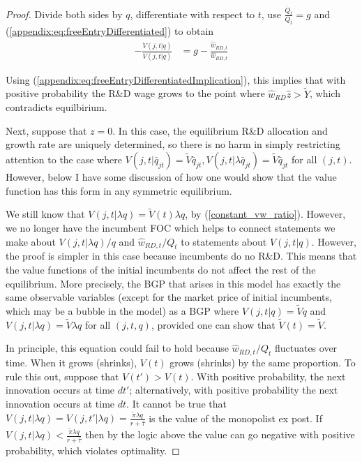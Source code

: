 \documentclass[11pt,english]{article}
\begin{document}
\begin{proof}
	Divide both sides by $q$, differentiate with respect to $t$, use $\frac{\dot{Q}_t}{Q_t} = g$ and  (\ref{appendix:eq:freeEntryDifferentiated}) to obtain
	\begin{align}
	-\frac{\dot{V}(j,t|q)}{V(j,t|q)} &= g - \frac{\dot{\hat{w}}_{RD,t}}{\hat{w}_{RD,t}}  \label{appendix:eq:freeEntryDifferentiatedImplication}
	\end{align}
	
	Using (\ref{appendix:eq:freeEntryDifferentiatedImplication}), this implies that with positive probability the R\&D wage grows to the point where $\hat{w}_{RD} \hat{z} > \tilde{Y}$, which contradicts equilbirium.
	
	Next, suppose that $z = 0$. In this case, the equilibrium R\&D allocation and growth rate are uniquely determined, so there is no harm in simply restricting attention to the case where $V(j,t|\bar{q}_{jt}) = \tilde{V}\bar{q}_{jt}, V(j,t|\lambda \bar{q}_{jt}) = \tilde{V} \bar{q}_{jt}$ for all $(j,t)$. However, below I have some discussion of how one would show that the value function has this form in any symmetric equilibrium.	
	
	We still know that $V(j,t|\lambda q) = \tilde{V}(t) \lambda q$, by (\ref{constant_vw_ratio}). However, we no longer have the incumbent FOC which helps to connect statements we make about $V(j,t|\lambda q) / q$ and $\hat{w}_{RD,t} / Q_t$ to statements about $V(j,t|q)$. However, the proof is simpler in this case because incumbents do no R\&D. This means that the value functions of the initial incumbents do not affect the rest of the equilibrium. More precisely, the BGP that arises in this model has exactly the same observable variables (except for the market price of initial incumbents, which may be a bubble in the model) as a BGP where $V(j,t|q) = \tilde{V}q$ and $V(j,t|\lambda q) = \tilde{V} \lambda q$ for all $(j,t,q)$, provided one can show that $\tilde{V}(t) = \tilde{V}$. 
	
	In principle, this equation could fail to hold because $\hat{w}_{RD,t} / Q_t$ fluctuates over time. When it grows (shrinks), $V(t)$ grows (shrinks) by the same proportion. To rule this out, suppose that $V(t') > V(t)$. With positive probability, the next innovation occurs at time $dt'$; alternatively, with positive probability the next innovation occurs at time $dt$. It cannot be true that $V(j,t|\lambda q) = V(j,t'|\lambda q) =  \frac{\tilde{\pi}\lambda q}{r + \hat{\tau}}$ is the value of the monopolist ex post. If $V(j,t|\lambda q) < \frac{\tilde{\pi}\lambda q}{r + \hat{\tau}}$ then by the logic above the value can go negative with positive probability, which violates optimality. 
	

\end{proof}
\end{document}
